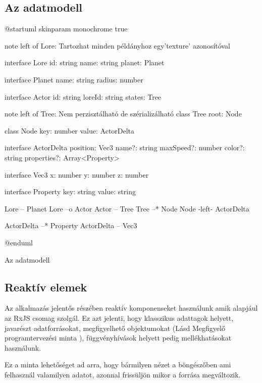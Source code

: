 \subsection{Az adatmodell}
\begin{plantuml}
@startuml
skinparam monochrome true

note left of Lore: Tartozhat minden példányhoz egy\nRxDocument 'texture' azonosítóval

interface Lore {
	id: string
	name: string
	planet: Planet
}

interface Planet {
	name: string
	radius: number
}

interface Actor {
	id: string
	loreId: string
	states: Tree
}

note left of Tree: Nem perzisztálható de szérializálható
class Tree {
	root: Node
}

class Node {
	key: number
	value: ActorDelta
}

interface ActorDelta {
	position: Vec3
	name?: string
	maxSpeed?: number
	color?: string
	properties?: Array<Property>
}

interface Vec3 {
	x: number
	y: number
	z: number
}

interface Property {
	key: string
	value: string
}

Lore -- Planet
Lore --o Actor
Actor -- Tree
Tree --* Node
Node -left- ActorDelta

ActorDelta --* Property
ActorDelta -- Vec3

@enduml
\caption{Az adatmodell}
\label{fig:data-model}
\end{plantuml}

\pagebreak

\subsection{Reaktív elemek}

Az alkalmazás jelentős részében reaktív komponenseket használunk amik alapjául az RxJS \cite{RxJS} csomag szolgál. Ez azt jelenti, hogy klasszikus adattagok helyett, javarészt adatforrásokat, megfigyelhető objektumokat (Lásd Megfigyelő programtervezési minta \cite{ObserverPattern}), függvényhívások helyett pedig mellékhatásokat használunk.

Ez a minta lehetőséget ad arra, hogy bármilyen nézet a böngészőben ami felhasznál valamilyen adatot, azonnal frissüljön mikor a forrása megváltozik.


